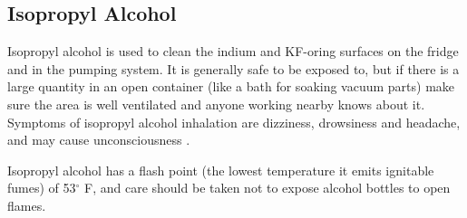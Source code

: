 \subsection{Isopropyl Alcohol}
Isopropyl alcohol is used to clean the indium and KF-oring surfaces on the fridge and in the pumping system.  It is generally safe to be exposed to, but if there is a large quantity in an open container (like a bath for soaking vacuum parts) make sure the area is well ventilated and anyone working nearby knows about it.  Symptoms of isopropyl alcohol inhalation are dizziness, drowsiness and headache, and may cause unconsciousness \cite{isopropmsds}. 

Isopropyl alcohol has a flash point (the lowest temperature it emits ignitable fumes) of 53$^\circ$ F, and care should be taken not to expose alcohol bottles to open flames.
